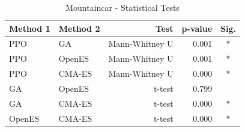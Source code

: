 \documentclass[12pt]{article}
\begin{document}
\begin{table}[h!]
\centering
\caption{Mountaincar - Statistical Tests}
\begin{tabular}{|l|l|r|r|c|}
\hline
\textbf{Method 1} & \textbf{Method 2} & \textbf{Test} & \textbf{p-value} & \textbf{Sig.} \\
\hline\hline
PPO & GA & Mann-Whitney U & 0.001 & $*$ \\
PPO & OpenES & Mann-Whitney U & 0.001 & $*$ \\
PPO & CMA-ES & Mann-Whitney U & 0.000 & $*$ \\
GA & OpenES & t-test & 0.799 &  \\
GA & CMA-ES & t-test & 0.000 & $*$ \\
OpenES & CMA-ES & t-test & 0.000 & $*$ \\
\hline
\end{tabular}
\end{table}
\end{document}
